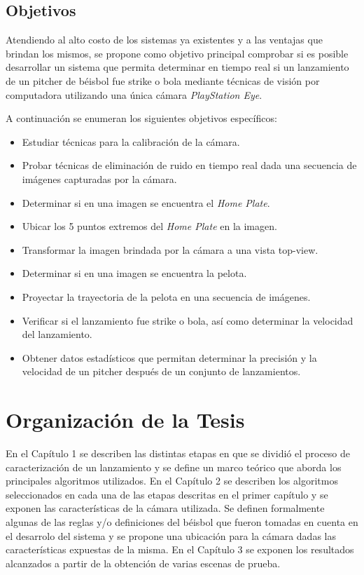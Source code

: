 \subsection*{Objetivos}

Atendiendo al alto costo de los sistemas ya existentes y a las ventajas que brindan los mismos, se propone como objetivo principal comprobar si es posible desarrollar un sistema que permita determinar en tiempo real si un lanzamiento de un pitcher de béisbol fue strike o bola mediante técnicas de visión por computadora utilizando una única cámara \textit{PlayStation Eye}.

A continuación se enumeran los siguientes objetivos específicos:
\begin{itemize}
    \item {Estudiar técnicas para la calibración de la cámara.}
    \item {Probar técnicas de eliminación de ruido en tiempo real dada una secuencia de imágenes capturadas por la cámara.}
    \item {Determinar si en una imagen se encuentra el \textit{Home Plate}.}
    \item {Ubicar los 5 puntos extremos del \textit{Home Plate} en la imagen.}
    \item {Transformar la imagen brindada por la cámara a una vista top-view.}
    \item {Determinar si en una imagen se encuentra la pelota.}
    \item {Proyectar la trayectoria de la pelota en una secuencia de imágenes.}
    \item {Verificar si el lanzamiento fue strike o bola, así como determinar la velocidad del lanzamiento.}
    \item {Obtener datos estadísticos que permitan determinar la precisión y la velocidad de un pitcher después de un conjunto de lanzamientos.}
\end{itemize}


\section*{Organización de la Tesis}

En el Capítulo 1 se describen las distintas etapas en que se dividió el proceso de caracterización de un lanzamiento y se define un marco teórico que aborda los principales algoritmos utilizados. En el Capítulo 2 se describen los algoritmos seleccionados en cada una de las etapas descritas en el primer capítulo y se exponen las características de la cámara utilizada. Se definen formalmente algunas de las reglas y/o definiciones del béisbol que fueron tomadas en cuenta en el desarrolo del sistema y se propone una ubicación para la cámara dadas las características expuestas de la misma. En el Capítulo 3 se exponen los resultados alcanzados a partir de la obtención de varias escenas de prueba.

